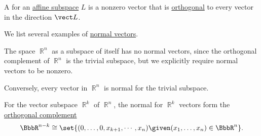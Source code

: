 \begin{definition}\label{def:normal_vector}\mimprovised
  A  for an \hyperref[def:affine_subspace]{affine subspace} \( L \) is a nonzero vector that is \hyperref[def:orthogonality]{orthogonal} to every vector in the direction \( \vect L \).
\end{definition}

\begin{example}\label{ex:def:normal_vector}
  We list several examples of \hyperref[def:normal_vector]{normal vectors}.

  \begin{thmenum}
     The space \( \BbbR^n \) as a subspace of itself has no normal vectors, since the orthogonal complement of \( \BbbR^n \) is the trivial subspace, but we explicitly require normal vectors to be nonzero.

     Conversely, every vector in \( \BbbR^n \) is normal for the trivial subspace.

     For the vector subspace \( \BbbR^k \) of \( \BbbR^n \), the normal for \( \BbbR^k \) vectors form the \hyperref[def:orthogonal_complement]{orthogonal complement}
    \begin{equation*}
      \BbbR^{n-k} \cong \set{ (0, \ldots, 0, x_{k+1}, \cdots, x_n) \given (x_1, \ldots, x_n) \in \BbbR^n }.
    \end{equation*}
  \end{thmenum}
\end{example}

